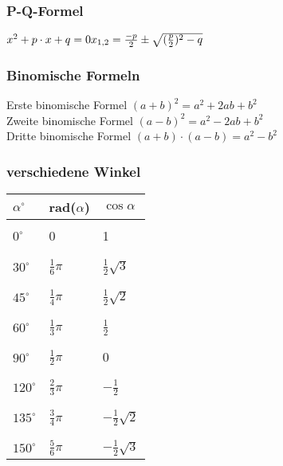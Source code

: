 \documentclass[6pt,a4paper]{scrartcl}
\begin{document}
\begin{multicols*}{3}
\subsubsection{P-Q-Formel}
$
x^2 + p\cdot x + q = 0\\
{x}_{1,2} = \frac{-p}{2} \pm \sqrt{(\frac{p}{2})^2 - q}
$
\subsubsection{Binomische Formeln}
Erste binomische Formel $(a+b)^{2}=a^{2} + 2ab + b^{2}$ \\
Zweite binomische Formel $(a-b)^{2}=a^{2} - 2ab + b^{2}$ \\
Dritte binomische Formel $(a+b)\cdot (a-b)=a^{2}-b^{2}$ \\

\subsubsection{verschiedene Winkel}
\begin{tabular}{lll}
$\alpha^\circ$&rad($\alpha$)&$\cos{\alpha}$\\
\hline
\\
$0^\circ$ & 0 & 1 \\
\\
\hline
\\
$30^\circ$  & $\frac{1}{6}\pi$  & $\frac{1}{2}\sqrt{3}$ \\
\\
\hline
\\
$45^\circ$  & $\frac{1}{4}\pi$  & $\frac{1}{2}\sqrt{2}$ \\
\\
\hline
\\
$60^\circ$  & $\frac{1}{3}\pi$  & $\frac{1}{2}$ \\
\\
\hline
\\
$90^\circ$  & $\frac{1}{2}\pi$  & $0$ \\
\\
\hline
\\
$120^\circ$ & $\frac{2}{3}\pi$  & $-\frac{1}{2}$ \\
\\
\hline
\\
$135^\circ$ & $\frac{3}{4}\pi$  & $-\frac{1}{2}\sqrt{2}$ \\
\\
\hline
\\
$150^\circ$ & $\frac{5}{6}\pi$  & $-\frac{1}{2}\sqrt{3}$ \\

\end{tabular}
\end{multicols*}
\end{document}
